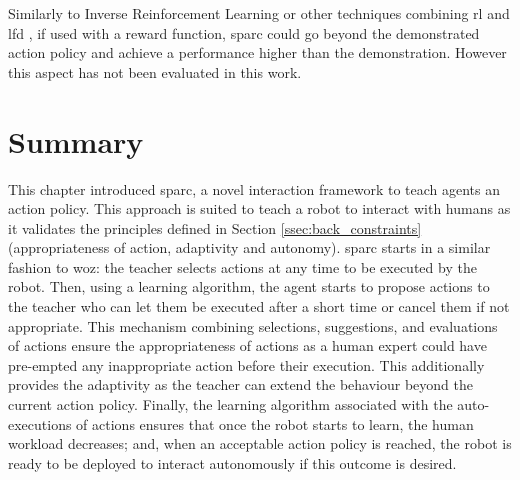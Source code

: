Similarly to Inverse Reinforcement Learning \citep{abbeel2004apprenticeship} or other techniques combining \gls{rl} and \gls{lfd} \citep{billard2008robot}, if used with a reward function, \gls{sparc} could go beyond the demonstrated action policy and achieve a performance higher than the demonstration. However this aspect has not been evaluated in this work.

\section{Summary}
    
This chapter introduced \acrfull{sparc}, a novel interaction framework to teach agents an action policy. This approach is suited to teach a robot to interact with humans as it validates the principles defined in Section \ref{ssec:back_constraints} (appropriateness of action, adaptivity and autonomy). \gls{sparc} starts in a similar fashion to \gls{woz}: the teacher selects actions at any time to be executed by the robot. Then, using a learning algorithm, the agent starts to propose actions to the teacher who can let them be executed after a short time or cancel them if not appropriate. This mechanism combining selections, suggestions, and evaluations of actions ensure the appropriateness of actions as a human expert could have pre-empted any inappropriate action before their execution. This additionally provides the adaptivity as the teacher can extend the behaviour beyond the current action policy. Finally, the learning algorithm associated with the auto-executions of actions ensures that once the robot starts to learn, the human workload decreases; and, when an acceptable action policy is reached, the robot is ready to be deployed to interact autonomously if this outcome is desired.
